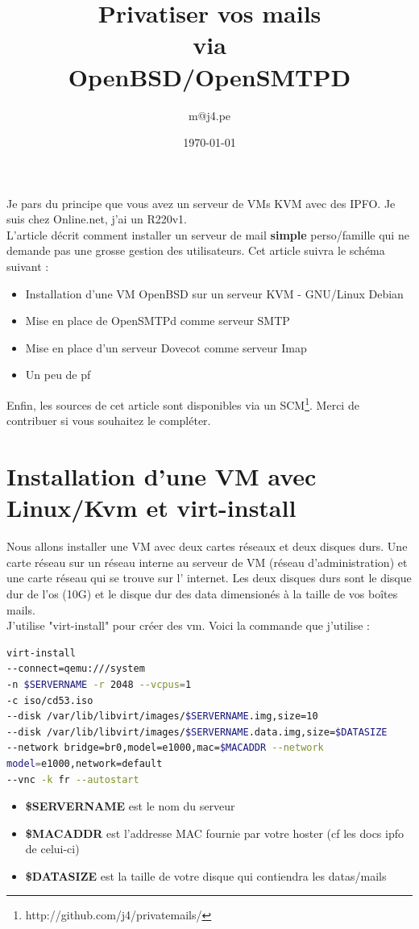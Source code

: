 \documentclass[a4paper,11pt]{article}
\title{Privatiser vos mails\\via\\OpenBSD/OpenSMTPD}
\author{m@j4.pe}
\date{\today}
\begin{document}
\maketitle

\abstract 

Je pars du principe que vous avez un serveur de VMs KVM avec des IPFO. Je suis
chez Online.net, j'ai un R220v1.\\
L'article décrit comment installer un serveur de mail {\bf simple} perso/famille 
qui ne demande pas une grosse gestion des utilisateurs.
Cet article suivra le schéma suivant :\\
\begin{itemize}
	\item Installation d'une VM OpenBSD sur un serveur KVM - GNU/Linux Debian
	\item Mise en place de OpenSMTPd comme serveur SMTP
	\item Mise en place d'un serveur Dovecot comme serveur Imap
	\item Un peu de pf
\end{itemize} 
\vspace{5mm}
Enfin, les sources de cet article sont disponibles via un SCM\footnote{http://github.com/j4/privatemails/}. 
Merci de contribuer si vous souhaitez le compléter.

\section*{Installation d'une VM avec Linux/Kvm et virt-install}

Nous allons installer une VM avec deux cartes réseaux et deux disques durs. Une
carte réseau sur un réseau interne au serveur de VM (réseau d'administration)
et une carte réseau qui se trouve sur l' internet. Les deux disques durs sont
le disque dur de l'os (10G) et le disque dur des data dimensionés à la taille
de vos boîtes mails.\\
J'utilise "virt-install" pour créer des vm. Voici la commande que j'utilise :

\vspace{5mm}
\begin{lstlisting}[language=bash,caption={Création d'une VM OpenBSD avec KVM},frame=bt,breaklines=true]
virt-install 
--connect=qemu:///system 
-n $SERVERNAME -r 2048 --vcpus=1 
-c iso/cd53.iso 
--disk /var/lib/libvirt/images/$SERVERNAME.img,size=10 
--disk /var/lib/libvirt/images/$SERVERNAME.data.img,size=$DATASIZE 
--network bridge=br0,model=e1000,mac=$MACADDR --network 
model=e1000,network=default 
--vnc -k fr --autostart
\end{lstlisting}
\vspace{5mm}
\begin{itemize}
	\item {\bf \$SERVERNAME} est le nom du serveur
	\item {\bf \$MACADDR} est l'addresse MAC fournie par votre hoster (cf les docs ipfo de
celui-ci)
	\item {\bf \$DATASIZE} est la taille de votre disque qui contiendra les datas/mails
\end{itemize}
\end{document}
